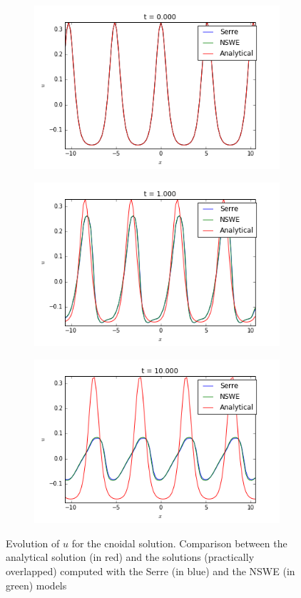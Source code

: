 \begin{figure}[h!]
	\begin{subfigure}{.3\linewidth}
		\includegraphics[scale=.3]{figures/Serre/cnoidal1u.png}	
	\end{subfigure}
	\begin{subfigure}{.3\linewidth}
		\includegraphics[scale=.3]{figures/Serre/cnoidal2u.png}	
	\end{subfigure}
	\begin{subfigure}{.3\linewidth}
		\includegraphics[scale=.3]{figures/Serre/cnoidal3u.png}	
	\end{subfigure}
	\caption{Evolution of $u$ for the cnoidal solution. Comparison between the analytical solution (in red) and the solutions (practically overlapped) computed with the Serre (in blue) and the NSWE (in green)  models \label{fig:cnoidalu}}
\end{figure}


